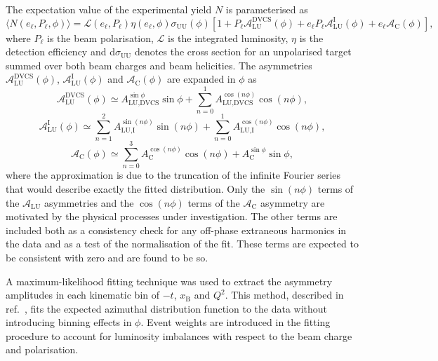 The expectation value of the experimental yield $N$ is parameterised as
\begin{equation}
 \langle N(e_{\ell},P_{\ell},\phi)\rangle =
\mathcal{L}(e_{\ell},P_{\ell})\eta(e_{\ell},\phi)\sigma_{\textrm{UU}}
(\phi)
[1+P_{\ell}\mathcal{A}_{\textrm{LU}}^{\textrm{DVCS}}(\phi)+e_{\ell}P_{\ell}
\mathcal{A}_{\textrm{LU}}^{\textrm{I}}(\phi)+e_{\ell}\mathcal{A}_{\textrm{C}}
(\phi)],
\end{equation}
where $P_\ell$ is the beam polarisation, $\mathcal{L}$ is the integrated luminosity, $\eta$ is the detection
efficiency and d$\sigma_{\textrm{UU}}$ denotes the
cross section for an unpolarised target summed over both beam charges and
beam helicities. The asymmetries $\mathcal{A}_{\textrm{LU}}^{\textrm{DVCS}}(\phi)$, $\mathcal{A}_{\textrm{LU}}^{\textrm{I}}(\phi)$ and
$\mathcal{A}_{\textrm{C}}(\phi)$ are expanded in
$\phi$ as
\begin{equation}
 \mathcal{A}_{\textrm{LU}}^{\textrm{DVCS}}(\phi) \simeq 
A_{\textrm{LU,DVCS}}^{\sin\phi}\sin\phi 
+ \sum^{1}_{n=0} A_{\textrm{LU,DVCS}}^{\cos(n\phi)}\cos(n\phi), 
\label{aludvcs_asym}
\end{equation}
\begin{equation}
\mathcal{A}_{\textrm{LU}}^{\textrm{I}}(\phi) \simeq \sum^{2}_{n=1}
A_{\textrm{LU,I}}^{\sin(n\phi)}\sin(n\phi) 
+ \sum^{1}_{n=0} A_{\textrm{LU,I}}^{\cos(n\phi)}\cos(n\phi), 
\label{alui_asym}
\end{equation}
\begin{equation}
\mathcal{A}_{\textrm{C}}(\phi) \simeq \sum^{3}_{n=0}
A_{\textrm{C}}^{\cos(n\phi)}\cos(n\phi) 
+ A_{\textrm{C}}^{\sin\phi}\sin\phi,
\label{ac_asym}
\end{equation}
where the approximation is due to the truncation of the infinite
Fourier series that would describe exactly the fitted distribution. Only the $\sin(n\phi)$ terms of the
$\mathcal{A}_{\textrm{LU}}$ asymmetries and the $\cos(n\phi)$ terms of the
$\mathcal{A}_{\textrm{C}}$ asymmetry are motivated by the
  physical processes under investigation. The other terms
are included both as a consistency check for any off-phase
extraneous harmonics in the data and as a test of the
normalisation of the fit. These terms are expected to be
consistent with zero and are found to be so.

A maximum-likelihood fitting technique \cite{Bar90} was used to
extract the asymmetry amplitudes in each kinematic bin of $-t$, $x_{\textrm{B}}$ and $Q^{2}$.
This method, described in ref.~\cite{Air08}, fits the expected
azimuthal distribution function to the data without introducing binning effects in $\phi$.
Event weights are introduced in the fitting procedure to account for
luminosity imbalances with respect to the beam charge and polarisation.

